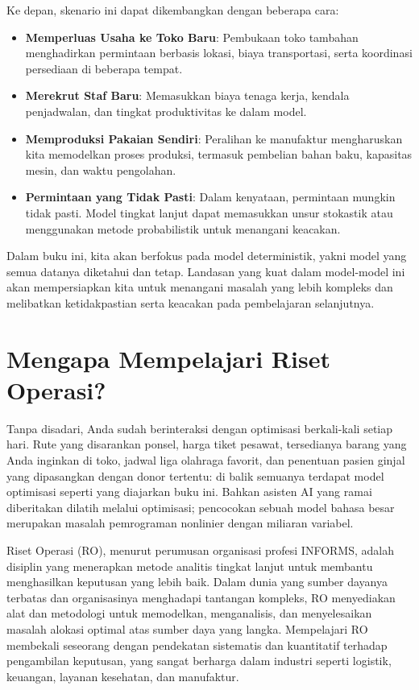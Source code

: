 Ke depan, skenario ini dapat dikembangkan dengan beberapa cara:

\begin{itemize}
    \item \textbf{Memperluas Usaha ke Toko Baru}: Pembukaan toko tambahan menghadirkan permintaan berbasis lokasi, biaya transportasi, serta koordinasi persediaan di beberapa tempat.
    \item \textbf{Merekrut Staf Baru}: Memasukkan biaya tenaga kerja, kendala penjadwalan, dan tingkat produktivitas ke dalam model.
    \item \textbf{Memproduksi Pakaian Sendiri}: Peralihan ke manufaktur mengharuskan kita memodelkan proses produksi, termasuk pembelian bahan baku, kapasitas mesin, dan waktu pengolahan.
    \item \textbf{Permintaan yang Tidak Pasti}: Dalam kenyataan, permintaan mungkin tidak pasti. Model tingkat lanjut dapat memasukkan unsur stokastik atau menggunakan metode probabilistik untuk menangani keacakan.
\end{itemize}

Dalam buku ini, kita akan berfokus pada model deterministik, yakni model yang semua datanya diketahui dan tetap. Landasan yang kuat dalam model-model ini akan mempersiapkan kita untuk menangani masalah yang lebih kompleks dan melibatkan ketidakpastian serta keacakan pada pembelajaran selanjutnya.

\section{Mengapa Mempelajari Riset Operasi?}
\label{sec:why-OR}

Tanpa disadari, Anda sudah berinteraksi dengan optimisasi berkali-kali setiap hari. Rute yang disarankan ponsel, harga tiket pesawat, tersedianya barang yang Anda inginkan di toko, jadwal liga olahraga favorit, dan penentuan pasien ginjal yang dipasangkan dengan donor tertentu: di balik semuanya terdapat model optimisasi seperti yang diajarkan buku ini. Bahkan asisten AI yang ramai diberitakan dilatih melalui optimisasi; pencocokan sebuah model bahasa besar merupakan masalah pemrograman nonlinier dengan miliaran variabel.

Riset Operasi (RO), menurut perumusan organisasi profesi INFORMS, adalah disiplin yang menerapkan metode analitis tingkat lanjut untuk membantu menghasilkan keputusan yang lebih baik. Dalam dunia yang sumber dayanya terbatas dan organisasinya menghadapi tantangan kompleks, RO menyediakan alat dan metodologi untuk memodelkan, menganalisis, dan menyelesaikan masalah alokasi optimal atas sumber daya yang langka. Mempelajari RO membekali seseorang dengan pendekatan sistematis dan kuantitatif terhadap pengambilan keputusan, yang sangat berharga dalam industri seperti logistik, keuangan, layanan kesehatan, dan manufaktur.

